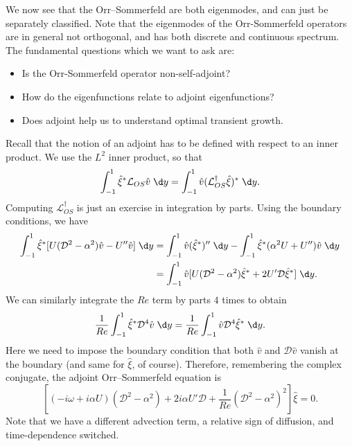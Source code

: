 \documentclass[a4paper]{article}
\begin{document}
We now see that the Orr--Sommerfeld are both eigenmodes, and can just be separately classified. Note that the eigenmodes of the Orr-Sommerfeld operators are in general not orthogonal, and has both discrete and continuous spectrum. The fundamental questions which we want to ask are:
\begin{itemize}
  \item Is the Orr-Sommerfeld operator non-self-adjoint?
  \item How do the eigenfunctions relate to adjoint eigenfunctions?
  \item Does adjoint help us to understand optimal transient growth.
\end{itemize}
Recall that the notion of an adjoint has to be defined with respect to an inner product. We use the $L^2$ inner product, so that
\[
  \int_{-1}^1 \hat{\xi}^* \mathcal{L}_{OS} \hat{v} \;\d y = \int_{-1}^1 \hat{v} (\mathcal{L}_{OS}^\dagger \hat{\xi})^*\;\d y.
\]
Computing $\mathcal{L}_{OS}^\dagger$ is just an exercise in integration by parts. Using the boundary conditions, we have
\begin{align*}
  \int_{-1}^1 \hat{\xi}^* [U(\mathcal{D}^2 - \alpha^2)\hat{v} - U'' \hat{v}]\;\d y &= \int_{-1}^1 \hat{v}(\hat{\xi}^*)'' \;\d y - \int_{-1}^1 \hat{\xi}^* (\alpha^2 U + U'') \hat{v}\;\d y\\
  &= \int_{-1}^1 \hat{v} [U(\mathcal{D}^2 - \alpha^2) \hat{\xi}^* + 2 U' \mathcal{D} \hat{\xi}^*]\;\d y.
\end{align*}
We can similarly integrate the $Re$ term by parts $4$ times to obtain
\[
  \frac{1}{Re} \int_{-1}^1 \hat{\xi}^* \mathcal{D}^4 \hat{v}\;\d y = \frac{1}{Re} \int_{-1}^1 \hat{v} \mathcal{D}^4 \hat{\xi}^* \;\d y.
\]
Here we need to impose the boundary condition that both $\hat{v}$ and $\mathcal{D}\hat{v}$ vanish at the boundary (and same for $\hat{\xi}$, of course). Therefore, remembering the complex conjugate, the adjoint Orr--Sommerfeld equation is
\[
  \left[(-i\omega + i \alpha U) (\mathcal{D}^2 - \alpha^2) + 2i\alpha U' \mathcal{D} + \frac{1}{Re} ( \mathcal{D}^2 - \alpha^2)^2\right] \hat{\xi} = 0.
\]
Note that we have a different advection term, a relative sign of diffusion, and time-dependence switched.
\end{document}
